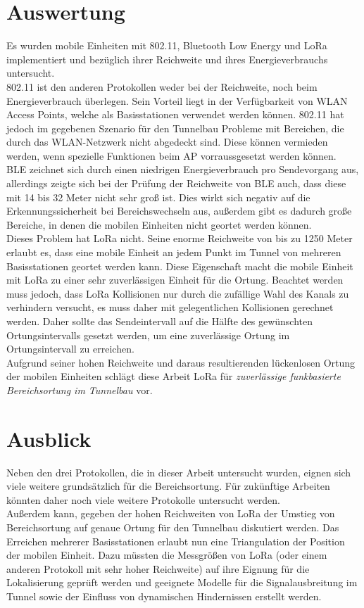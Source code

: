 \section{Auswertung}
Es wurden mobile Einheiten mit 802.11, Bluetooth Low Energy und LoRa implementiert und bezüglich ihrer Reichweite und ihres Energieverbrauchs untersucht.\\
802.11 ist den anderen Protokollen weder bei der Reichweite, noch beim Energieverbrauch überlegen. 
Sein Vorteil liegt in der Verfügbarkeit von WLAN Access Points, welche als Basisstationen verwendet werden können.
802.11 hat jedoch im gegebenen Szenario für den Tunnelbau Probleme mit Bereichen, die durch das WLAN-Netzwerk nicht abgedeckt sind. 
Diese können vermieden werden, wenn spezielle Funktionen beim AP vorraussgesetzt werden können.\\
BLE zeichnet sich durch einen niedrigen Energieverbrauch pro Sendevorgang aus, allerdings zeigte sich bei der Prüfung der Reichweite von BLE auch, dass diese mit 14 bis 32 Meter nicht sehr groß ist.
Dies wirkt sich negativ auf die Erkennungssicherheit bei Bereichswechseln aus, außerdem gibt es dadurch große Bereiche, in denen die mobilen Einheiten nicht geortet werden können.\\
Dieses Problem hat LoRa nicht. 
Seine enorme Reichweite von bis zu 1250 Meter erlaubt es, dass eine mobile Einheit an jedem Punkt im Tunnel von mehreren Basisstationen geortet werden kann.
Diese Eigenschaft macht die mobile Einheit mit LoRa zu einer sehr zuverlässigen Einheit für die Ortung.
Beachtet werden muss jedoch, dass LoRa Kollisionen nur durch die zufällige Wahl des Kanals zu verhindern versucht, es muss daher mit gelegentlichen Kollisionen gerechnet werden.
Daher sollte das Sendeintervall auf die Hälfte des gewünschten Ortungsintervalls gesetzt werden, um eine zuverlässige Ortung im Ortungsintervall zu erreichen.\\
Aufgrund seiner hohen Reichweite und daraus resultierenden lückenlosen Ortung der mobilen Einheiten schlägt diese Arbeit LoRa für \emph{zuverlässige funkbasierte Bereichsortung im Tunnelbau} vor.

\section{Ausblick}
Neben den drei Protokollen, die in dieser Arbeit untersucht wurden, eignen sich viele weitere grundsätzlich für die Bereichsortung.
Für zukünftige Arbeiten könnten daher noch viele weitere Protokolle untersucht werden. \\
Außerdem kann, gegeben der hohen Reichweiten von LoRa der Umstieg von Bereichsortung auf genaue Ortung für den Tunnelbau diskutiert werden. 
Das Erreichen mehrerer Basisstationen erlaubt nun eine Triangulation der Position der mobilen Einheit.
Dazu müssten die Messgrößen von LoRa (oder einem anderen Protokoll mit sehr hoher Reichweite) auf ihre Eignung für die Lokalisierung geprüft werden und geeignete Modelle für die Signalausbreitung im Tunnel sowie der Einfluss von dynamischen Hindernissen erstellt werden.

